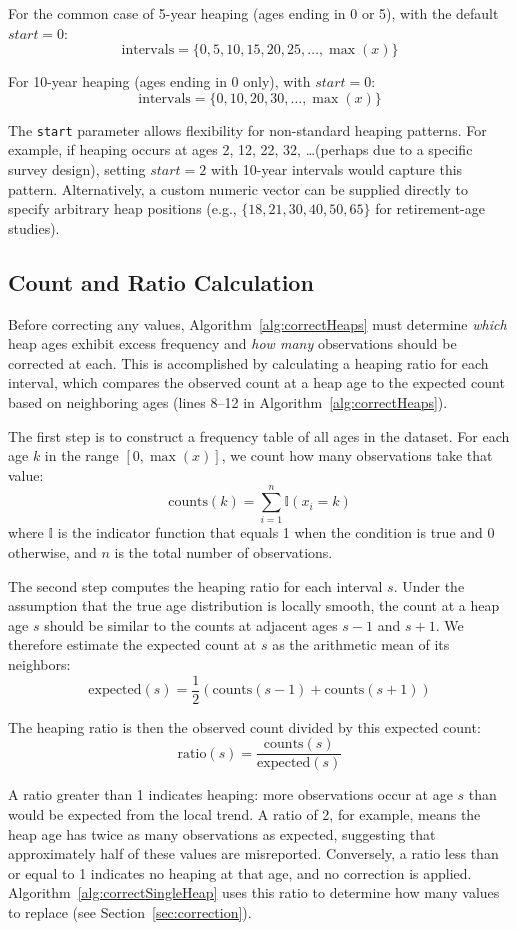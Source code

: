 \documentclass[12pt]{article}
\theoremstyle{plain}
\theoremstyle{definition}
\begin{document}
For the common case of 5-year heaping (ages ending in 0 or 5), with the default $start = 0$:
\[
\text{intervals} = \{0, 5, 10, 15, 20, 25, \ldots, \max(x)\}
\]

For 10-year heaping (ages ending in 0 only), with $start = 0$:
\[
\text{intervals} = \{0, 10, 20, 30, \ldots, \max(x)\}
\]

The \texttt{start} parameter allows flexibility for non-standard heaping patterns. For example, if heaping occurs at ages 2, 12, 22, 32, \ldots (perhaps due to a specific survey design), setting $start = 2$ with 10-year intervals would capture this pattern. Alternatively, a custom numeric vector can be supplied directly to specify arbitrary heap positions (e.g., $\{18, 21, 30, 40, 50, 65\}$ for retirement-age studies).

\subsection{Count and Ratio Calculation}

Before correcting any values, Algorithm~\ref{alg:correctHeaps} must determine \emph{which} heap ages exhibit excess frequency and \emph{how many} observations should be corrected at each. This is accomplished by calculating a heaping ratio for each interval, which compares the observed count at a heap age to the expected count based on neighboring ages (lines 8--12 in Algorithm~\ref{alg:correctHeaps}).

The first step is to construct a frequency table of all ages in the dataset. For each age $k$ in the range $[0, \max(x)]$, we count how many observations take that value:
\[
\text{counts}(k) = \sum_{i=1}^{n} \mathbb{I}(x_i = k)
\]
where $\mathbb{I}$ is the indicator function that equals 1 when the condition is true and 0 otherwise, and $n$ is the total number of observations.

The second step computes the heaping ratio for each interval $s$. Under the assumption that the true age distribution is locally smooth, the count at a heap age $s$ should be similar to the counts at adjacent ages $s-1$ and $s+1$. We therefore estimate the expected count at $s$ as the arithmetic mean of its neighbors:
\[
\text{expected}(s) = \frac{1}{2} \left( \text{counts}(s-1) + \text{counts}(s+1) \right)
\]

The heaping ratio is then the observed count divided by this expected count:
\[
\text{ratio}(s) = \frac{\text{counts}(s)}{\text{expected}(s)}
\]

A ratio greater than 1 indicates heaping: more observations occur at age $s$ than would be expected from the local trend. A ratio of 2, for example, means the heap age has twice as many observations as expected, suggesting that approximately half of these values are misreported. Conversely, a ratio less than or equal to 1 indicates no heaping at that age, and no correction is applied. Algorithm~\ref{alg:correctSingleHeap} uses this ratio to determine how many values to replace (see Section~\ref{sec:correction}).
\end{document}
